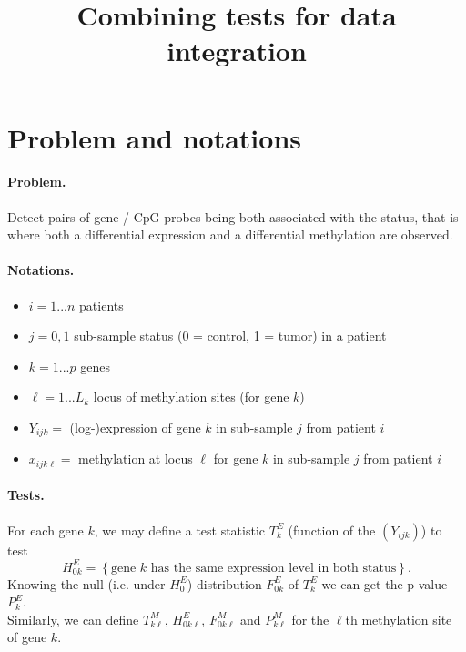 \documentclass[a4paper, 11pt]{article}
\title{Combining tests for data integration}
\author{}
\begin{document}
\maketitle

\section{Problem and notations}

\paragraph{Problem.} Detect pairs of gene / CpG probes being both associated with the status, that is where both a differential expression and a differential methylation are observed.

\paragraph{Notations.}
\begin{itemize}
 \item $i = 1 ... n$ patients
 \item $j = 0, 1$ sub-sample status (0 = control, 1 = tumor) in a patient
 \item $k = 1 ... p$ genes
 \item $\ell = 1 ... L_k$ locus of methylation sites (for gene $k$)
 \item $Y_{ijk} =$ (log-)expression of gene $k$ in sub-sample $j$ from patient $i$
 \item $x_{ijk\ell} =$ methylation at locus $\ell$ for gene $k$ in sub-sample $j$ from patient $i$
\end{itemize}

\paragraph{Tests.} For each gene $k$, we may define a test statistic $T^E_k$ (function of the $(Y_{ijk})$) to test 
$$
H_{0k}^E = \left\{\text{gene $k$ has the same expression level in both status}\right\}.
$$
Knowing the null (i.e. under $H^E_0$) distribution $F^E_{0k}$ of $T^E_k$ we can get the p-value $P^E_k$. \\
Similarly, we can define $T^M_{k\ell}$, $H_{0k\ell}^E$, $F^M_{0k\ell}$ and $P^M_{k\ell}$ for the $\ell$th methylation site of gene $k$.
\end{document}
